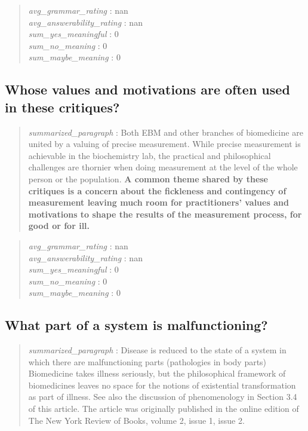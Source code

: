 \begin{quote}
\emph{avg\_grammar\_rating} : nan\\
\emph{avg\_answerability\_rating} : nan\\
\emph{sum\_yes\_meaningful} : 0\\
\emph{sum\_no\_meaning} : 0\\
\emph{sum\_maybe\_meaning} : 0
\end{quote}

\hypertarget{whose-values-and-motivations-are-often-used-in-these-critiques}{%
\subsection{Whose values and motivations are often used in these
critiques?}\label{whose-values-and-motivations-are-often-used-in-these-critiques}}

\begin{quote}
\emph{summarized\_paragraph} : Both EBM and other branches of
biomedicine are united by a valuing of precise measurement. While
precise measurement is achievable in the biochemistry lab, the practical
and philosophical challenges are thornier when doing measurement at the
level of the whole person or the population. \textbf{A common theme
shared by these critiques is a concern about the fickleness and
contingency of measurement leaving much room for practitioners' values
and motivations to shape the results of the measurement process, for
good or for ill.}
\end{quote}

\begin{quote}
\emph{avg\_grammar\_rating} : nan\\
\emph{avg\_answerability\_rating} : nan\\
\emph{sum\_yes\_meaningful} : 0\\
\emph{sum\_no\_meaning} : 0\\
\emph{sum\_maybe\_meaning} : 0
\end{quote}

\hypertarget{what-part-of-a-system-is-malfunctioning}{%
\subsection{What part of a system is
malfunctioning?}\label{what-part-of-a-system-is-malfunctioning}}

\begin{quote}
\emph{summarized\_paragraph} : Disease is reduced to the state of a
system in which there are malfunctioning parts (pathologies in body
parts) Biomedicine takes illness seriously, but the philosophical
framework of biomedicines leaves no space for the notions of existential
transformation as part of illness. See also the discussion of
phenomenology in Section 3.4 of this article. The article was originally
published in the online edition of The New York Review of Books, volume
2, issue 1, issue 2.
\end{quote}

